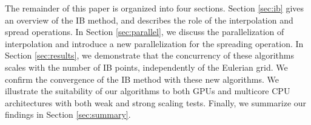 The remainder of this paper is organized into four sections. Section \ref{sec:ib} gives
an overview of the IB method, and describes the role of the interpolation and spread
operations. In Section \ref{sec:parallel}, we discuss the parallelization of
interpolation and introduce a new parallelization for the spreading operation. In Section
\ref{sec:results}, we demonstrate that the concurrency of these algorithms scales with
the number of IB points, independently of the Eulerian grid. We confirm the convergence
of the IB method with these new algorithms. We illustrate the suitability of our
algorithms to both GPUs and multicore CPU architectures with both weak and strong scaling
tests. Finally, we summarize our findings in Section \ref{sec:summary}.

